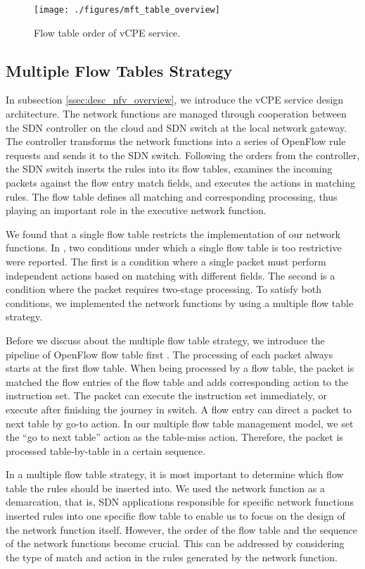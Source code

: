 \documentclass[conference]{IEEEtran}
\begin{document}
\begin{figure}[!t]
\centering
\texttt{[image: ./figures/mft\_table\_overview]}
\caption{Flow table order of vCPE service.}
\label{fig:mft_table_overview}
\end{figure}

\subsection{Multiple Flow Tables Strategy}
In subsection \ref{ssec:desc_nfv_overview}, we introduce the vCPE service design architecture. The network functions are managed through cooperation between the SDN controller on the cloud and SDN switch at the local network gateway. The controller transforms the network functions into a series of OpenFlow rule requests and sends it to the SDN switch. Following the orders from the controller, the SDN switch inserts the rules into its flow tables, examines the incoming packets against the flow entry match fields, and executes the actions in matching rules. The flow table \cite{sdn-ft} defines all matching and corresponding processing, thus playing an important role in the executive network function.

We found that a single flow table restricts the implementation of our network functions. In \cite{onf-multi-tables}, two conditions under which a single flow table is too restrictive were reported. The first is a condition where a single packet must perform independent actions based on matching with different fields. The second is a condition where the packet requires two-stage processing. To satisfy both conditions, we implemented the network functions by using a multiple flow table strategy.

Before we discuss about the multiple flow table strategy, we introduce the pipeline of OpenFlow flow table first \cite{sp:openflow13}. The processing of each packet always starts at the first flow table. When being processed by a flow table, the packet is matched the flow entries of the flow table and adds corresponding action to the instruction set. The packet can execute the instruction set immediately, or execute after finishing the journey in switch. A flow entry can direct a packet to next table by go-to action. In our multiple flow table management model, we set the ``go to next table'' action as the table-miss action. Therefore, the packet is processed table-by-table in a certain sequence.

In a multiple flow table strategy, it is most important to determine which flow table the rules should be inserted into. We used the network function as a demarcation, that is, SDN applications responsible for specific network functions inserted rules into one specific flow table to enable us to focus on the design of the network function itself. However, the order of the flow table and the sequence of the network functions become crucial. This can be addressed by considering the type of match and action in the rules generated by the network function.
\end{document}
